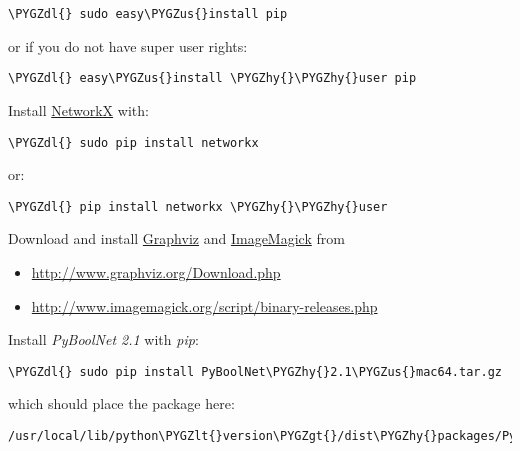 \documentclass[letterpaper,10pt,english]{sphinxmanual}
\def\PYGZus{\char`\_}
\def\PYGZlt{\char`\<}
\def\PYGZgt{\char`\>}
\def\PYGZdl{\char`\$}
\def\PYGZhy{\char`\-}
\begin{document}
\begin{Verbatim}[commandchars=\\\{\}]
\PYGZdl{} sudo easy\PYGZus{}install pip
\end{Verbatim}

or if you do not have super user rights:

\begin{Verbatim}[commandchars=\\\{\}]
\PYGZdl{} easy\PYGZus{}install \PYGZhy{}\PYGZhy{}user pip
\end{Verbatim}

Install \href{https://networkx.github.io/}{NetworkX} with:

\begin{Verbatim}[commandchars=\\\{\}]
\PYGZdl{} sudo pip install networkx
\end{Verbatim}

or:

\begin{Verbatim}[commandchars=\\\{\}]
\PYGZdl{} pip install networkx \PYGZhy{}\PYGZhy{}user
\end{Verbatim}

Download and install \href{http://www.graphviz.org/}{Graphviz} and \href{http://www.imagemagick.org/script/index.php}{ImageMagick} from
\begin{itemize}
\item {} 
\href{http://www.graphviz.org/Download.php}{http://www.graphviz.org/Download.php}

\item {} 
\href{http://www.imagemagick.org/script/binary-releases.php}{http://www.imagemagick.org/script/binary-releases.php}

\end{itemize}

Install \emph{PyBoolNet 2.1} with \emph{pip}:

\begin{Verbatim}[commandchars=\\\{\}]
\PYGZdl{} sudo pip install PyBoolNet\PYGZhy{}2.1\PYGZus{}mac64.tar.gz
\end{Verbatim}

which should place the package here:

\begin{Verbatim}[commandchars=\\\{\}]
/usr/local/lib/python\PYGZlt{}version\PYGZgt{}/dist\PYGZhy{}packages/PyBoolNet
\end{Verbatim}
\end{document}
